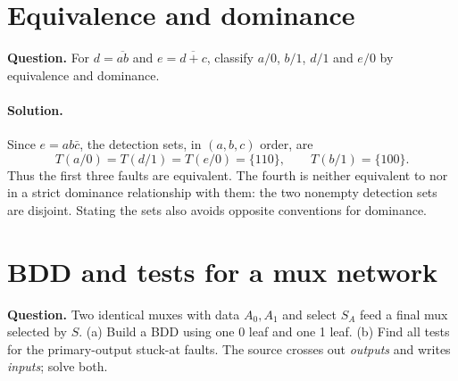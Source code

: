 \documentclass[11pt]{article}
\newcommand{\sol}{\paragraph{Solution.}}
\begin{document}
\section{Equivalence and dominance}
\textbf{Question.} For $d=\overline{ab}$ and $e=\overline{d+c}$, classify
$a/0$, $b/1$, $d/1$ and $e/0$ by equivalence and dominance.
\begin{center}\end{center}

\sol Since $e=ab\bar c$, the detection sets, in $(a,b,c)$ order, are
\[
T(a/0)=T(d/1)=T(e/0)=\{110\},\qquad T(b/1)=\{100\}.
\]
Thus the first three faults are equivalent. The fourth is neither equivalent to
nor in a strict dominance relationship with them: the two nonempty detection
sets are disjoint. Stating the sets also avoids opposite conventions for dominance.

\section{BDD and tests for a mux network}
\textbf{Question.} Two identical muxes with data $A_0,A_1$ and select $S_A$
feed a final mux selected by $S$.
(a) Build a BDD using one 0 leaf and one 1 leaf.
(b) Find all tests for the primary-output stuck-at faults.
The source crosses out \emph{outputs} and writes \emph{inputs}; solve both.
\begin{center}\end{center}
\end{document}

